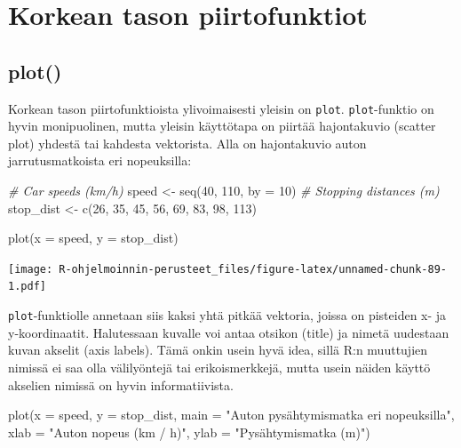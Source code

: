 \documentclass[
]{book}
\newenvironment{Shaded}{\begin{snugshade}}{\end{snugshade}}
\newcommand{\AttributeTok}[1]{\textcolor[rgb]{0.77,0.63,0.00}{#1}}
\newcommand{\CommentTok}[1]{\textcolor[rgb]{0.56,0.35,0.01}{\textit{#1}}}
\newcommand{\DecValTok}[1]{\textcolor[rgb]{0.00,0.00,0.81}{#1}}
\newcommand{\FunctionTok}[1]{\textcolor[rgb]{0.00,0.00,0.00}{#1}}
\newcommand{\NormalTok}[1]{#1}
\newcommand{\OtherTok}[1]{\textcolor[rgb]{0.56,0.35,0.01}{#1}}
\newcommand{\StringTok}[1]{\textcolor[rgb]{0.31,0.60,0.02}{#1}}
\begin{document}
\hypertarget{korkean-tason-piirtofunktiot}{%
\section{Korkean tason piirtofunktiot}\label{korkean-tason-piirtofunktiot}}

\hypertarget{plot}{%
\subsection{plot()}\label{plot}}

Korkean tason piirtofunktioista ylivoimaisesti yleisin on \texttt{plot}. \texttt{plot}-funktio on hyvin monipuolinen, mutta yleisin käyttötapa on piirtää hajontakuvio (scatter plot) yhdestä tai kahdesta vektorista. Alla on hajontakuvio auton jarrutusmatkoista eri nopeuksilla:

\begin{Shaded}
\begin{Highlighting}[]
\CommentTok{\# Car speeds (km/h)}
\NormalTok{speed }\OtherTok{\textless{}{-}} \FunctionTok{seq}\NormalTok{(}\DecValTok{40}\NormalTok{, }\DecValTok{110}\NormalTok{, }\AttributeTok{by =} \DecValTok{10}\NormalTok{)}
\CommentTok{\# Stopping distances (m)}
\NormalTok{stop\_dist }\OtherTok{\textless{}{-}} \FunctionTok{c}\NormalTok{(}\DecValTok{26}\NormalTok{, }\DecValTok{35}\NormalTok{, }\DecValTok{45}\NormalTok{, }\DecValTok{56}\NormalTok{, }\DecValTok{69}\NormalTok{, }\DecValTok{83}\NormalTok{, }\DecValTok{98}\NormalTok{, }\DecValTok{113}\NormalTok{)}

\FunctionTok{plot}\NormalTok{(}\AttributeTok{x =}\NormalTok{ speed, }\AttributeTok{y =}\NormalTok{ stop\_dist)}
\end{Highlighting}
\end{Shaded}

\texttt{[image: R-ohjelmoinnin-perusteet\_files/figure-latex/unnamed-chunk-89-1.pdf]}

\texttt{plot}-funktiolle annetaan siis kaksi yhtä pitkää vektoria, joissa on pisteiden x- ja y-koordinaatit. Halutessaan kuvalle voi antaa otsikon (title) ja nimetä uudestaan kuvan akselit (axis labels). Tämä onkin usein hyvä idea, sillä R:n muuttujien nimissä ei saa olla välilyöntejä tai erikoismerkkejä, mutta usein näiden käyttö akselien nimissä on hyvin informatiivista.

\begin{Shaded}
\begin{Highlighting}[]
\FunctionTok{plot}\NormalTok{(}\AttributeTok{x =}\NormalTok{ speed, }\AttributeTok{y =}\NormalTok{ stop\_dist,}
     \AttributeTok{main =} \StringTok{"Auton pysähtymismatka eri nopeuksilla"}\NormalTok{,}
     \AttributeTok{xlab =} \StringTok{"Auton nopeus (km / h)"}\NormalTok{, }\AttributeTok{ylab =} \StringTok{"Pysähtymismatka (m)"}\NormalTok{)}
\end{Highlighting}
\end{Shaded}
\end{document}
